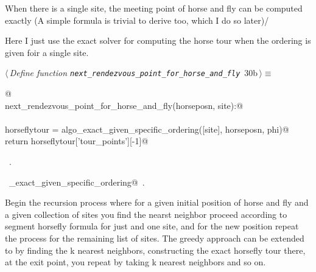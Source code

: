 \documentclass[11.5pt]{report}
\begin{document}


\needspace{5cm}
\vspace{-0.8cm} \newchunk   When there is a single site, the meeting point of horse and fly
can be computed exactly (A simple formula is trivial to derive too, which I do so later)/ 

Here I just use the exact solver for computing the horse tour when the ordering is given 
foir a single site. 

\begin{flushleft} \small
\begin{minipage}{\linewidth}\label{scrap38}\raggedright\small
{} $\langle\,${\itshape Define function \verb|next_rendezvous_point_for_horse_and_fly|}\nobreak\ {\footnotesize {30b}}$\,\rangle\equiv$
\vspace{-1ex}
\begin{list}{}{} \item
\mbox{}\verb@   @\\
\mbox{}\verb@def next_rendezvous_point_for_horse_and_fly(horseposn, site):@\\
\mbox{}\verb@@\\
\mbox{}\verb@     horseflytour = algo_exact_given_specific_ordering([site], horseposn, phi)@\\
\mbox{}\verb@     return horseflytour['tour_points'][-1]@\\
\mbox{}\verb@@{\NWsep}
\end{list}
\vspace{-1.5ex}
\footnotesize
\begin{list}{}{\setlength{\itemsep}{-\parsep}\setlength{\itemindent}{-\leftmargin}}
\item \NWtxtMacroRefIn\ .
\item \NWtxtIdentsUsed\nobreak\  \verb@algo_exact_given_specific_ordering@\nobreak\ .
\item{}
\end{list}
\end{minipage}\vspace{4ex}
\end{flushleft}


\vspace{-0.8cm} \newchunk
Begin the recursion process where for a given initial
position of horse and fly and a given collection of sites
you find the nearst neighbor proceed according to segment
horsefly formula for just and one site, and for the new
position repeat the process for the remaining list of sites. 
The greedy approach can be extended to by finding the k
nearest neighbors, constructing the exact horsefly tour
there, at the exit point, you repeat by taking k nearest
neighbors and so on. 
\end{document}
